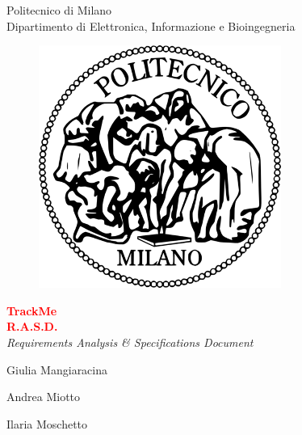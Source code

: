 \thispagestyle{empty}

\begin{center}

	\Huge Politecnico di Milano  \\   	\vspace{14pt}
    \Large Dipartimento di Elettronica, Informazione e Bioingegneria
    
    \vspace{30pt}
    
      \begin{figure}[h]
      	\centering
        \includegraphics[scale=0.7]{Pictures/Logo.png}
      \end{figure}
    
    \vspace{25pt}
    
    \Huge \textbf{\textcolor{red}{TrackMe}}
    \\
    \vspace{12pt}
    \huge \textbf{\textcolor{red}{R.A.S.D.}} \\
    \vspace{7pt}
    \Large \emph{Requirements Analysis \& Specifications Document} \\
    
    \vspace{120pt}
    
    \large Giulia Mangiaracina \\
    
    \vspace{5pt}
    
    \large Andrea Miotto \\
    
    \vspace{5pt}
    
    \large Ilaria Moschetto
    
    
\end{center}